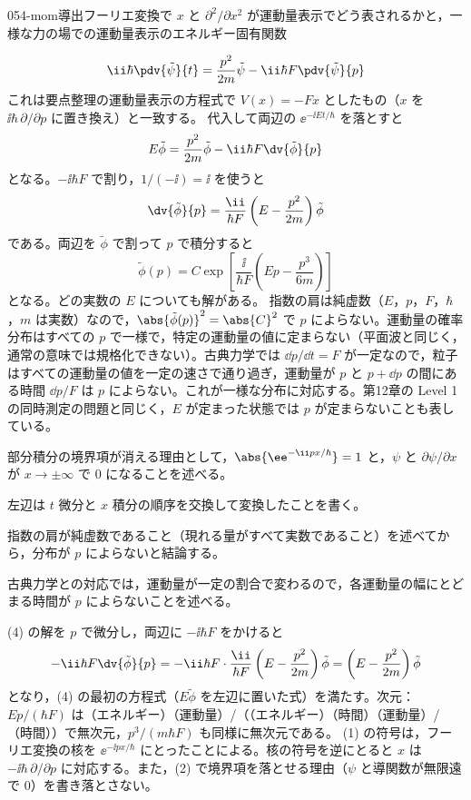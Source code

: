 \documentclass[uplatex,dvipdfmx,a4paper,11pt]{jsarticle}
\begin{document}
\begin{mondai}{054-mom}{導出}{フーリエ変換で $x$ と $\partial^{2}/\partial x^{2}$ が運動量表示でどう表されるかと，一様な力の場での運動量表示のエネルギー固有関数}
\begin{tadashii}
\[ \ii\hbar\pdv{\tilde{\psi}}{t}=\frac{p^{2}}{2m}\tilde{\psi}-\ii\hbar F\pdv{\tilde{\psi}}{p} \]
これは要点整理の運動量表示の方程式で $V(x)=-Fx$ としたもの（$x$ を $\ii\hbar\,\partial/\partial p$ に置き換え）と一致する。
 代入して両辺の $\ee^{-\ii Et/\hbar}$ を落とすと
\[ E\tilde{\phi}=\frac{p^{2}}{2m}\tilde{\phi}-\ii\hbar F\dv{\tilde{\phi}}{p} \]
となる。$-\ii\hbar F$ で割り，$1/(-\ii)=\ii$ を使うと
\[ \dv{\tilde{\phi}}{p}=\frac{\ii}{\hbar F}\left(E-\frac{p^{2}}{2m}\right)\tilde{\phi} \]
である。両辺を $\tilde{\phi}$ で割って $p$ で積分すると
\[ \tilde{\phi}(p)=C\exp\left[\frac{\ii}{\hbar F}\left(Ep-\frac{p^{3}}{6m}\right)\right] \]
となる。どの実数の $E$ についても解がある。
 指数の肩は純虚数（$E$，$p$，$F$，$\hbar$，$m$ は実数）なので，$\abs{\tilde{\phi}(p)}^{2}=\abs{C}^{2}$ で $p$ によらない。運動量の確率分布はすべての $p$ で一様で，特定の運動量の値に定まらない（平面波と同じく，通常の意味では規格化できない）。古典力学では $\dd p/\dd t=F$ が一定なので，粒子はすべての運動量の値を一定の速さで通り過ぎ，運動量が $p$ と $p+\dd p$ の間にある時間 $\dd p/F$ は $p$ によらない。これが一様な分布に対応する。第12章の Level 1 の同時測定の問題と同じく，$E$ が定まった状態では $p$ が定まらないことも表している。
\begin{ronten}
  \item {} 部分積分の境界項が消える理由として，$\abs{\ee^{-\ii px/\hbar}}=1$ と，$\psi$ と $\partial\psi/\partial x$ が $x\to\pm\infty$ で $0$ になることを述べる。
  \item {} 左辺は $t$ 微分と $x$ 積分の順序を交換して変換したことを書く。
  \item {} 指数の肩が純虚数であること（現れる量がすべて実数であること）を述べてから，分布が $p$ によらないと結論する。
  \item {} 古典力学との対応では，運動量が一定の割合で変わるので，各運動量の幅にとどまる時間が $p$ によらないことを述べる。
\end{ronten}
\kenzan (4) の解を $p$ で微分し，両辺に $-\ii\hbar F$ をかけると
\[ -\ii\hbar F\dv{\tilde{\phi}}{p}=-\ii\hbar F\cdot\frac{\ii}{\hbar F}\left(E-\frac{p^{2}}{2m}\right)\tilde{\phi}=\left(E-\frac{p^{2}}{2m}\right)\tilde{\phi} \]
となり，(4) の最初の方程式（$E\tilde{\phi}$ を左辺に置いた式）を満たす。次元：$Ep/(\hbar F)$ は（エネルギー）（運動量）/（（エネルギー）（時間）（運動量）/（時間））で無次元，$p^{3}/(m\hbar F)$ も同様に無次元である。
\tsumazuki (1) の符号は，フーリエ変換の核を $\ee^{-\ii px/\hbar}$ にとったことによる。核の符号を逆にとると $x$ は $-\ii\hbar\,\partial/\partial p$ に対応する。また，(2) で境界項を落とせる理由（$\psi$ と導関数が無限遠で $0$）を書き落とさない。
\end{tadashii}
\end{mondai}

\noteowari
\end{document}

